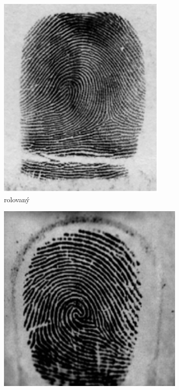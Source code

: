   \begin{figure}[h]\centering
    \centering
    \begin{subfigure}[b]{0.32\linewidth}
      \includegraphics[width=\linewidth]{obrazky-figures/rolovany_odtlacok-Drahansky.png}
      \caption{rolovaný}
      \label{obr:rolovany_odtlacok}
    \end{subfigure}
    \hfill
    \begin{subfigure}[b]{0.32\linewidth}
      \includegraphics[width=\linewidth]{obrazky-figures/pichany_odtlacok-Drahansky.png}

\end{subfigure}
\end{figure}

